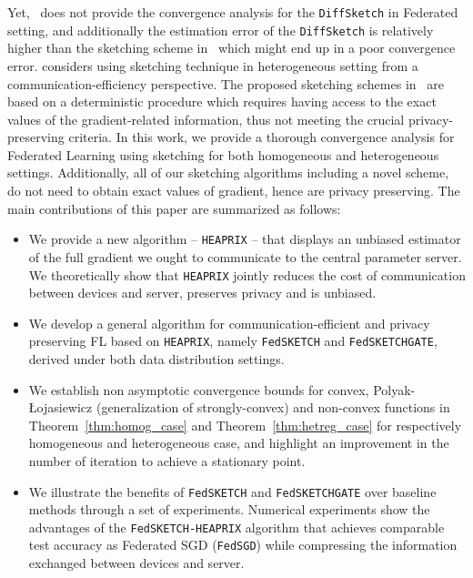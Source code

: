 \documentclass[twoside]{article}
\newcommand{\pl}{Polyak-\L{}ojasiewicz}
\begin{document}
Yet,~\cite{li2019privacy} does not provide the convergence analysis for the \texttt{DiffSketch} in Federated setting, and additionally the estimation error of the \texttt{DiffSketch} is relatively higher than the sketching scheme in~\cite{ivkin2019communication} which might end up in a poor convergence error. 
\cite{rothchild2020fetchsgd} considers using sketching technique in heterogeneous setting from a communication-efficiency perspective. 
The proposed sketching schemes in~\cite{ivkin2019communication,rothchild2020fetchsgd} are based on a deterministic procedure which requires having access to the exact values of the gradient-related information, thus not meeting the crucial privacy-preserving criteria.   
In this work, we provide a thorough convergence analysis for Federated Learning using sketching for both homogeneous and heterogeneous settings. 
Additionally, all of our sketching algorithms including a novel scheme, do not need to obtain exact values of gradient, hence are privacy preserving. 
The main contributions of this paper are summarized as follows:
\begin{itemize}
    \item We provide a new algorithm -- \texttt{HEAPRIX} -- that displays an unbiased estimator of the full gradient we ought to communicate to the central parameter server. We theoretically show that \texttt{HEAPRIX} jointly reduces the cost of communication between devices and server, preserves privacy and is unbiased.
    \item We develop a general algorithm for communication-efficient and privacy preserving FL based on \texttt{HEAPRIX}, namely \texttt{FedSKETCH} and \texttt{FedSKETCHGATE}, derived under both data distribution settings.
    \item We establish non asymptotic convergence bounds for convex, \pl\: (generalization of strongly-convex) and non-convex functions in Theorem~\ref{thm:homog_case} and Theorem~\ref{thm:hetreg_case} for respectively  homogeneous and heterogeneous case,  and highlight an improvement in the number of iteration to achieve a stationary point.
    \item We illustrate the benefits of \texttt{FedSKETCH} and \texttt{FedSKETCHGATE} over baseline methods through a set of experiments. 
    Numerical experiments show the advantages of the \texttt{FedSKETCH-HEAPRIX} algorithm that achieves comparable test accuracy as Federated SGD (\texttt{FedSGD}) while compressing the information exchanged between devices and server.
\end{itemize}
\end{document}
